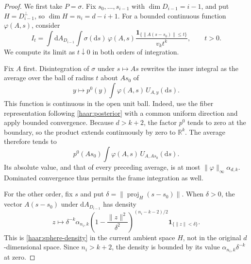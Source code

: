 \begin{proof}
We first take $P=\sigma$.  Fix $s_0,\ldots,s_{i-1}$ with
$\dim D_{i-1}=i-1$, and put $H=D_{i-1}^\perp$, so $\dim H=n_i=d-i+1$.
For a bounded continuous function $\varphi(A,s)$, consider
\begin{equation}\label{haar:small-ball-insertion}
 I_t=\int\mathrm dA_{D_{i-1}}\int\sigma(\mathrm ds)\,
       \varphi(A,s)
       \frac{\mathbf 1_{\{\lVert A(s-s_0)\rVert\le t\}}}{v_kt^k},
       \qquad t>0.
\end{equation}
We compute its limit as $t\downarrow0$ in both orders of integration.

Fix $A$ first.  Disintegration of $\sigma$ under $s\mapsto As$ rewrites
the inner integral as the average over the ball of radius $t$ about $As_0$
of
\[
 y\longmapsto p^0(y)\int\varphi(A,s)\,U_{A,y}(\mathrm ds).
\]
This function is continuous in the open unit ball.  Indeed, use the fiber
representation following \eqref{haar:posterior} with a common uniform
direction and apply bounded convergence.  Because $d>k+2$, the factor
$p^0$ tends to zero at the boundary, so the product extends continuously
by zero to $\mathbb R^k$.  The average therefore tends to
\begin{equation}\label{haar:first-order-limit}
 p^0(As_0)\int\varphi(A,s)\,U_{A,As_0}(\mathrm ds).
\end{equation}
Its absolute value, and that of every preceding average, is at most
$\lVert\varphi\rVert_\infty\alpha_{d,k}$.  Dominated convergence thus
permits the frame integration as well.

For the other order, fix $s$ and put
$\delta=\lVert\operatorname{proj}_H(s-s_0)\rVert$.  When $\delta>0$,
the vector $A(s-s_0)$ under $\mathrm dA_{D_{i-1}}$ has density
\begin{equation}\label{haar:insertion-density}
 z\longmapsto\delta^{-k}\alpha_{n_i,k}
       \left(1-\frac{\lVert z\rVert^2}{\delta^2}\right)^{(n_i-k-2)/2}
       \mathbf 1_{\{\lVert z\rVert<\delta\}}.
\end{equation}
This is \eqref{haar:sphere-density} in the current ambient space $H$,
not in the original $d$-dimensional space.  Since $n_i>k+2$, the density
is bounded by its value $\alpha_{n_i,k}\delta^{-k}$ at zero.


\end{proof}
